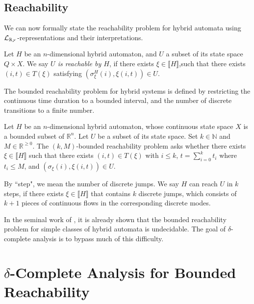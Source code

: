 \documentclass[12pt]{llncs}
\newtheorem{notation}[theorem]{Notation}
\begin{document}
\subsection{Reachability}
We can now formally state the reachability problem for hybrid automata using $\mathcal{L}_{\mathbb{R}_{\mathcal{F}}}$-representations and their interpretations.
\begin{definition}[Reachability]\label{reachability}
Let $H$ be an $n$-dimensional hybrid automaton, and $U$ a subset of its state
space $Q\times X$.  We say {\em $U$ is reachable by $H$}, if there exists
$\xi\in\llbracket
H \rrbracket$,such that there exists $(i,t)\in T(\xi)$ satisfying
$(\sigma^H_{\xi}(i), \xi(i,t))\in U.$
\end{definition}
The bounded reachability problem for hybrid systems is defined by restricting
the continuous time duration to a bounded interval, and the number
of discrete transitions to a finite number.
\begin{definition}
Let $H$ be an $n$-dimensional hybrid automaton, whose continuous state space
$X$ is a bounded subset of $\mathbb{R}^n$. Let $U$ be a subset of its state
space. Set $k\in \mathbb{N}$ and $M \in \mathbb{R}^{\geq 0}$. The {$(k,M)$-bounded
reachability problem} asks whether there exists
$\xi\in\llbracket H \rrbracket$ such that there exists $(i,t)\in T(\xi)$ with $i\leq k$, $t=
\sum_{i=0}^k t_i$ where $t_i \leq M$, and $(\sigma_{\xi}(i), \xi(i,t))\in U.$
\end{definition}
\begin{remark}
By ``step", we mean the number of discrete jumps. We say $H$ can reach $U$ in $k$ steps, if there exists $\xi\in\llbracket H\rrbracket$ that contains $k$ discrete jumps, which consists of $k+1$ pieces of continuous flows in the corresponding discrete modes.
\end{remark}

In the seminal work of \cite{DBLP:conf/rex/AlurD91,DBLP:conf/hybrid/AlurCHH92}, it is already shown that the bounded reachability problem for simple classes of hybrid automata is undecidable. The goal of $\delta$-complete analysis is to bypass much of this difficulty.

\section{$\delta$-Complete Analysis for Bounded Reachability}\label{main}
\end{document}
